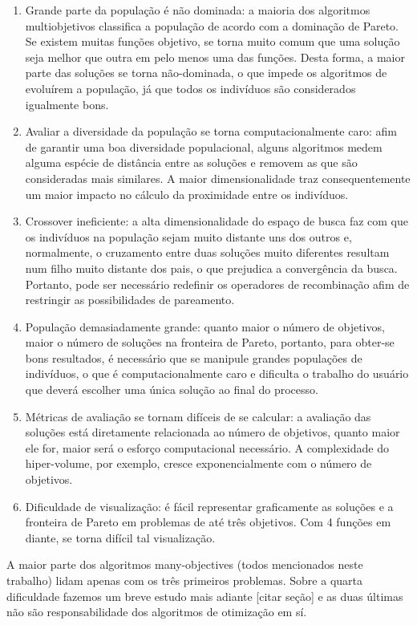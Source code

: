 \begin{enumerate}  
	\item Grande parte da população é não dominada: a maioria dos algoritmos multiobjetivos classifica a população de acordo com a dominação de Pareto. Se existem muitas funções objetivo, se torna muito comum que uma solução seja melhor que outra em pelo menos uma das funções. Desta forma, a maior parte das soluções se torna não-dominada, o que impede os algoritmos de evoluírem a população, já que todos os indivíduos são considerados igualmente bons.
	\item Avaliar a diversidade da população se torna computacionalmente caro: afim de garantir uma boa diversidade populacional, alguns algoritmos medem alguma espécie de distância entre as soluções e removem as que são consideradas mais similares. A maior dimensionalidade traz consequentemente um maior impacto no cálculo da proximidade entre os indivíduos. 
	\item Crossover ineficiente: a alta dimensionalidade do espaço de busca faz com que os indivíduos na população sejam muito distante uns dos outros e, normalmente, o cruzamento entre duas soluções muito diferentes resultam num filho muito distante dos pais, o que prejudica a convergência da busca. Portanto, pode ser necessário redefinir os operadores de recombinação afim de restringir as possibilidades de pareamento.
	\item População demasiadamente grande: quanto maior o número de objetivos, maior o número de soluções na fronteira de Pareto, portanto, para obter-se bons resultados, é necessário que se manipule grandes populações de indivíduos, o que é computacionalmente caro e dificulta o trabalho do usuário que deverá escolher uma única solução ao final do processo.
	\item Métricas de avaliação se tornam difíceis de se calcular: a avaliação das soluções está diretamente relacionada ao número de objetivos, quanto maior ele for, maior será o esforço computacional necessário. A complexidade do hiper-volume, por exemplo, cresce exponencialmente com o número de objetivos.
	\item Dificuldade de visualização: é fácil representar graficamente as soluções e a fronteira de Pareto em problemas de até três objetivos. Com 4 funções em diante, se torna difícil tal visualização.
\end{enumerate}

A maior parte dos algoritmos many-objectives (todos mencionados neste trabalho) lidam apenas com os três primeiros problemas. Sobre a quarta dificuldade fazemos um breve estudo mais adiante [citar seção] e as duas últimas não são responsabilidade dos algoritmos de otimização em sí.

